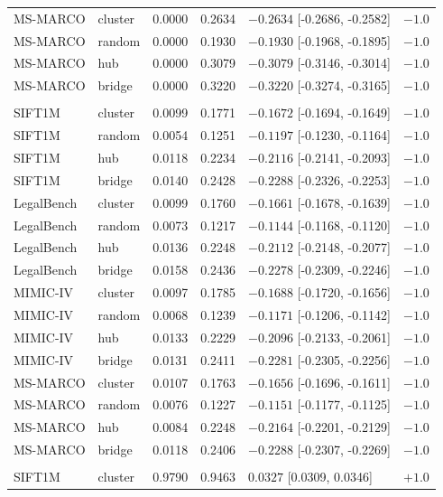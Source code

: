 \documentclass[sigconf, nonacm, review]{acmart}
\begin{document}
\begin{table}[t]
\begin{tabular}{@{}llrrlr@{}}
MS-MARCO & cluster & 0.0000 & 0.2634 & $-0.2634$ [-0.2686, -0.2582] & $-1.0$ \\
MS-MARCO & random & 0.0000 & 0.1930 & $-0.1930$ [-0.1968, -0.1895] & $-1.0$ \\
MS-MARCO & hub & 0.0000 & 0.3079 & $-0.3079$ [-0.3146, -0.3014] & $-1.0$ \\
MS-MARCO & bridge & 0.0000 & 0.3220 & $-0.3220$ [-0.3274, -0.3165] & $-1.0$ \\
\addlinespace[2pt]
\multicolumn{6}{@{}l}{\emph{Answer drift@10}}\\
SIFT1M & cluster & 0.0099 & 0.1771 & $-0.1672$ [-0.1694, -0.1649] & $-1.0$ \\
SIFT1M & random & 0.0054 & 0.1251 & $-0.1197$ [-0.1230, -0.1164] & $-1.0$ \\
SIFT1M & hub & 0.0118 & 0.2234 & $-0.2116$ [-0.2141, -0.2093] & $-1.0$ \\
SIFT1M & bridge & 0.0140 & 0.2428 & $-0.2288$ [-0.2326, -0.2253] & $-1.0$ \\
LegalBench & cluster & 0.0099 & 0.1760 & $-0.1661$ [-0.1678, -0.1639] & $-1.0$ \\
LegalBench & random & 0.0073 & 0.1217 & $-0.1144$ [-0.1168, -0.1120] & $-1.0$ \\
LegalBench & hub & 0.0136 & 0.2248 & $-0.2112$ [-0.2148, -0.2077] & $-1.0$ \\
LegalBench & bridge & 0.0158 & 0.2436 & $-0.2278$ [-0.2309, -0.2246] & $-1.0$ \\
MIMIC-IV & cluster & 0.0097 & 0.1785 & $-0.1688$ [-0.1720, -0.1656] & $-1.0$ \\
MIMIC-IV & random & 0.0068 & 0.1239 & $-0.1171$ [-0.1206, -0.1142] & $-1.0$ \\
MIMIC-IV & hub & 0.0133 & 0.2229 & $-0.2096$ [-0.2133, -0.2061] & $-1.0$ \\
MIMIC-IV & bridge & 0.0131 & 0.2411 & $-0.2281$ [-0.2305, -0.2256] & $-1.0$ \\
MS-MARCO & cluster & 0.0107 & 0.1763 & $-0.1656$ [-0.1696, -0.1611] & $-1.0$ \\
MS-MARCO & random & 0.0076 & 0.1227 & $-0.1151$ [-0.1177, -0.1125] & $-1.0$ \\
MS-MARCO & hub & 0.0084 & 0.2248 & $-0.2164$ [-0.2201, -0.2129] & $-1.0$ \\
MS-MARCO & bridge & 0.0118 & 0.2406 & $-0.2288$ [-0.2307, -0.2269] & $-1.0$ \\
\addlinespace[2pt]
\multicolumn{6}{@{}l}{\emph{Recall@10}}\\
SIFT1M & cluster & 0.9790 & 0.9463 & $0.0327$ [0.0309, 0.0346] & $+1.0$ \\

\end{tabular}
\end{table}
\end{document}
